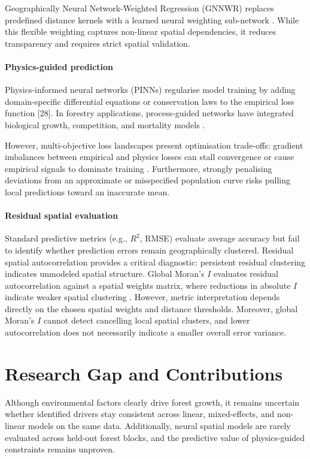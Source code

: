 \documentclass[logo,msc,ai]{infthesis}           %
\begin{document}
Geographically Neural Network-Weighted Regression (GNNWR) replaces predefined distance kernels with a learned neural weighting sub-network \cite{du2020Geographically_C6_GWR}. While this flexible weighting captures non-linear spatial dependencies, it reduces transparency and requires strict spatial validation. 

\paragraph*{Physics-guided prediction}
Physics-informed neural networks (PINNs) regularise model training by adding domain-specific differential equations or conservation laws to the empirical loss function [28]. In forestry applications, process-guided networks have integrated biological growth, competition, and mortality models \cite{pichler2025Inferring_C4_NN}.

However, multi-objective loss landscapes present optimisation trade-offs: gradient imbalances between empirical and physics losses can stall convergence or cause empirical signals to dominate training \cite{wang2021Understanding_C4_NN}. Furthermore, strongly penalising deviations from an approximate or misspecified population curve risks pulling local predictions toward an inaccurate mean.

\paragraph*{Residual spatial evaluation}
Standard predictive metrics (e.g., $R^2$, RMSE) evaluate average accuracy but fail to identify whether prediction errors remain geographically clustered. Residual spatial autocorrelation provides a critical diagnostic: persistent residual clustering indicates unmodeled spatial structure. Global Moran's $I$ evaluates residual autocorrelation against a spatial weights matrix, where reductions in absolute $I$ indicate weaker spatial clustering \cite{moran1950Notes_c5_eval, kim2021Predicting_C5_EVAL}. However, metric interpretation depends directly on the chosen spatial weights and distance thresholds. Moreover, global Moran's $I$ cannot detect cancelling local spatial clusters, and lower autocorrelation does not necessarily indicate a smaller overall error variance.

\section{Research Gap and Contributions}
Although environmental factors clearly drive forest growth, it remains uncertain whether identified drivers stay consistent across linear, mixed-effects, and non-linear models on the same data. Additionally, neural spatial models are rarely evaluated across held-out forest blocks, and the predictive value of physics-guided constraints remains unproven.
\end{document}

